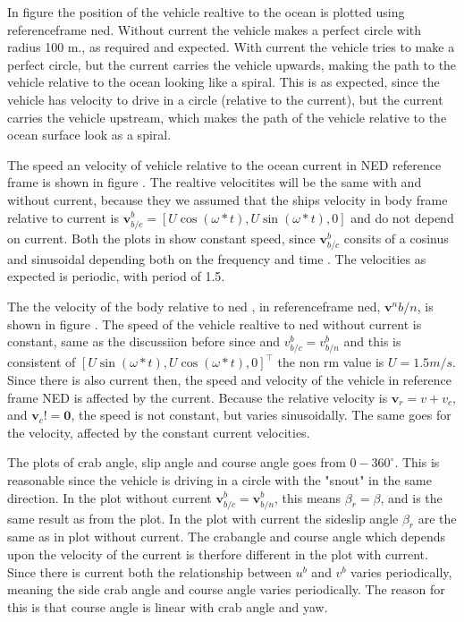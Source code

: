 In figure  the position of the vehicle realtive to the ocean is plotted using referenceframe ned. Without current the vehicle makes a perfect circle with radius 100 m., as required and expected. With current the vehicle tries to make a perfect circle, but the current carries the vehicle upwards, making the path to the vehicle relative to  the ocean looking like a spiral. This is as expected, since the vehicle has velocity to drive in a circle (relative to the current), but the current carries the vehicle upstream, which makes the path of the vehicle relative to the ocean surface look as a spiral.

The speed an velocity of vehicle relative to the ocean current in NED reference frame is shown in figure . The realtive velocitites will be the same with and without current, because they we assumed that the ships velocity in body frame relative to current is $\mathbf{v}^b_{b/c} = [U \cos(\omega  *t), U \sin(\omega*t) , 0]$ and do not depend on current. Both the plots in  show constant speed, since $\mathbf{v}^b_{b/c}$ consits of a cosinus and sinusoidal  depending both on the  frequency and time . The velocities as expected is periodic, with period of 1.5. 



The the velocity of the body  relative to ned , in referenceframe ned, $\mathbf{v}^n{b/n}$,  is shown in figure . The speed of the vehicle realtive to ned without current is constant, same as the discussiion before since and $v^b_{b/c}=v^b_{b/n}$ and this is consistent of $[U \sin(\omega *t), U \cos(\omega*t),0]^\top$ the non rm value is $U = 1.5 m/s$. Since there is also current then, the speed and velocity of the vehicle in reference frame NED is affected by the current. Because the relative velocity is $\mathbf{v}_r = v + v_c$, and $\mathbf{v}_c != \mathbf{0}$, the speed is not constant, but varies sinusoidally. The same goes for the velocity, affected by the constant current velocities.

The plots of crab angle, slip angle and course angle goes from $0-360^\circ$. This is reasonable since the vehicle is driving in a circle with the "snout"  in the same direction. In the plot without current $\mathbf{v}^b_{b/c} = \mathbf{v}^b_{b/n} $, this means $\beta_r = \beta$, and is the same result as from the plot. In the plot with current the sideslip angle $\beta_r$ are the same as in plot without current. The crabangle and course angle which depends upon the velocity of the current is therfore different in the plot with current. Since there is current both the relationship between $u^b$ and $v^b$ varies periodically, meaning the side crab angle and course angle varies periodically. The reason for this is that course angle  is linear with crab angle and yaw. 

